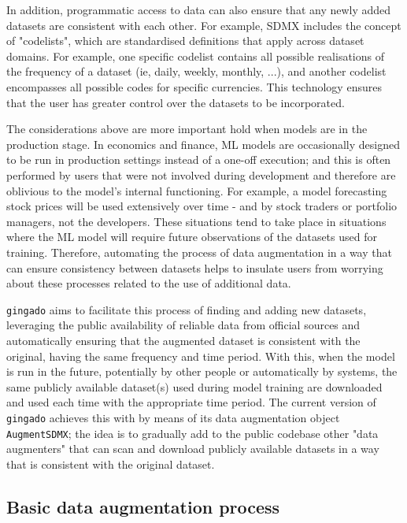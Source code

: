 \documentclass{article}
\begin{document}
In addition, programmatic access to data can also ensure that any newly added datasets are consistent with each other. For example, SDMX includes the concept of "codelists", which are standardised definitions that apply across dataset domains. For example, one specific codelist contains all possible realisations of the frequency of a dataset (ie, daily, weekly, monthly, ...), and another codelist encompasses all possible codes for specific currencies. This technology ensures that the user has greater control over the datasets to be incorporated.

The considerations above are more important hold when models are in the production stage. In economics and finance, ML models are occasionally designed to be run in production settings instead of a one-off execution; and this is often performed by users that were not involved during development and therefore are oblivious to the model's internal functioning. For example, a model forecasting stock prices will be used extensively over time - and by stock traders or portfolio managers, not the developers. These situations tend to take place in situations where the ML model will require future observations of the datasets used for training. Therefore, automating the process of data augmentation in a way that can ensure consistency between datasets helps to insulate users from worrying about these processes related to the use of additional data.

\texttt{gingado} aims to facilitate this process of finding and adding new datasets, leveraging the public availability of reliable data from official sources and automatically ensuring that the augmented dataset is consistent with the original, having the same frequency and time period. With this, when the model is run in the future, potentially by other people or automatically by systems, the same publicly available dataset(s) used during model training are downloaded and used each time with the appropriate time period. The current version of \texttt{gingado} achieves this with by means of its data augmentation object \texttt{AugmentSDMX}; the idea is to gradually add to the public codebase other "data augmenters" that can scan and download publicly available datasets in a way that is consistent with the original dataset.

\subsection{Basic data augmentation process}
\end{document}

